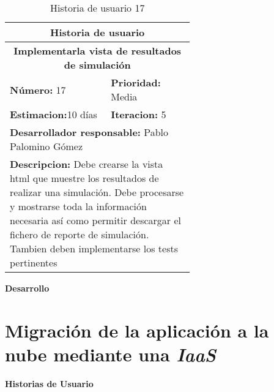 \begin{table}[H]
        \centering
        \begin{tabular}{|p{0.3\linewidth}|p{0.3\linewidth}|}
          \hline
          \multicolumn{2}{|c|}{Historia de usuario}\\ \hline
          \multicolumn{2}{|c|}{\textbf{Implementarla vista de resultados de simulación}}\\ \hline
          \textbf{Número:} 17 & \textbf{Prioridad:} Media\\ \hline
          \textbf{Estimacion:}10 días & \textbf{Iteracion:} 5\\ \hline
          \multicolumn{2}{|l|}{\textbf{Desarrollador responsable:} Pablo Palomino Gómez}\\ \hline
          \multicolumn{2}{|p{0.6\linewidth}|}{\textbf{Descripcion:} Debe crearse la vista html que muestre los resultados de realizar una simulación. Debe procesarse y mostrarse toda la información necesaria así como permitir descargar el fichero de reporte de simulación. Tambien deben implementarse los tests pertinentes}\\ \hline
        \end{tabular}
        \caption{Historia de usuario 17}
        \label{tab:hist17}
\end{table}
\textbf{Desarrollo}\\


\section{Migración de la aplicación a la nube mediante una \textit{IaaS}}
\textbf{Historias de Usuario}\\


